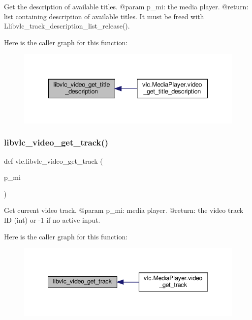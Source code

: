 \begin{DoxyVerb}Get the description of available titles.
@param p_mi: the media player.
@return: list containing description of available titles. It must be freed with L{libvlc_track_description_list_release}().
\end{DoxyVerb}
 Here is the caller graph for this function\+:
\nopagebreak
\begin{figure}[H]
\begin{center}
\leavevmode
\includegraphics[width=336pt]{namespacevlc_aff9b7b91e260510010e50e5fdf038bc1_icgraph}
\end{center}
\end{figure}
\mbox{\label{namespacevlc_a0f6ee7f1555386407042f47c88cef65d}} 
\subsubsection{\texorpdfstring{libvlc\+\_\+video\+\_\+get\+\_\+track()}{libvlc\_video\_get\_track()}}
{\footnotesize\ttfamily def vlc.\+libvlc\+\_\+video\+\_\+get\+\_\+track (\begin{DoxyParamCaption}\item[{}]{p\+\_\+mi }\end{DoxyParamCaption})}

\begin{DoxyVerb}Get current video track.
@param p_mi: media player.
@return: the video track ID (int) or -1 if no active input.
\end{DoxyVerb}
 Here is the caller graph for this function\+:
\nopagebreak
\begin{figure}[H]
\begin{center}
\leavevmode
\includegraphics[width=342pt]{namespacevlc_a0f6ee7f1555386407042f47c88cef65d_icgraph}
\end{center}
\end{figure}
\mbox{\label{namespacevlc_a87f53e3e2f2f5b5a0c24aaa72e6575b0}} 
